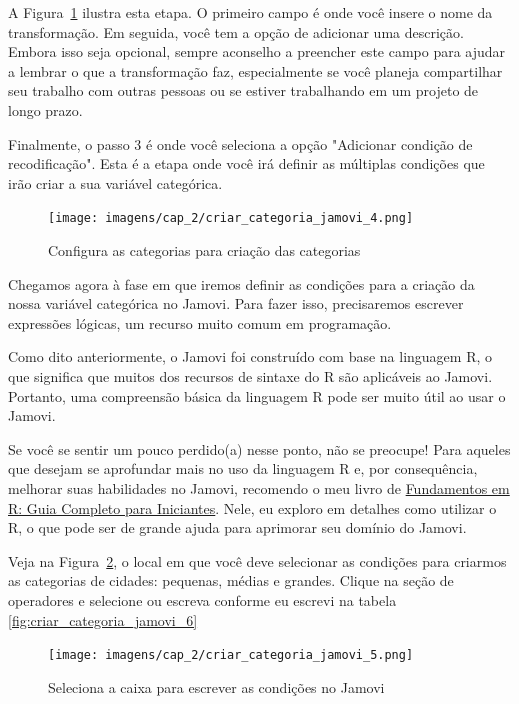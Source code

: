 A Figura~\ref{fig:criar_categoria_jamovi_4} ilustra esta etapa. O primeiro campo é onde você insere o nome da transformação. Em seguida, você tem a opção de adicionar uma descrição. Embora isso seja opcional, sempre aconselho a preencher este campo para ajudar a lembrar o que a transformação faz, especialmente se você planeja compartilhar seu trabalho com outras pessoas ou se estiver trabalhando em um projeto de longo prazo.

Finalmente, o passo 3 é onde você seleciona a opção "Adicionar condição de recodificação". Esta é a etapa onde você irá definir as múltiplas condições que irão criar a sua variável categórica.

\begin{figure}[H]
    \centering
    \caption{Configura as categorias para criação das categorias}
    \texttt{[image: imagens/cap\_2/criar\_categoria\_jamovi\_4.png]}
    \label{fig:criar_categoria_jamovi_4}
\end{figure}

Chegamos agora à fase em que iremos definir as condições para a criação da nossa variável categórica no Jamovi. Para fazer isso, precisaremos escrever expressões lógicas, um recurso muito comum em programação. 

Como dito anteriormente, o Jamovi foi construído com base na linguagem R, o que significa que muitos dos recursos de sintaxe do R são aplicáveis ao Jamovi. Portanto, uma compreensão básica da linguagem R pode ser muito útil ao usar o Jamovi.

Se você se sentir um pouco perdido(a) nesse ponto, não se preocupe! Para aqueles que desejam se aprofundar mais no uso da linguagem R e, por consequência, melhorar suas habilidades no Jamovi, recomendo o meu livro de \href{https://www.amazon.com.br/Fundamentos-Completo-Iniciantes-programa%C3%A7%C3%A3o-computa%C3%A7%C3%A3o-ebook/dp/B0B36NG18N}{Fundamentos em R: Guia Completo para Iniciantes}. Nele, eu exploro em detalhes como utilizar o R, o que pode ser de grande ajuda para aprimorar seu domínio do Jamovi.

Veja na Figura~\ref{fig:criar_categoria_jamovi_5}, o local em que você deve selecionar as condições para criarmos as categorias de cidades: pequenas, médias e grandes. Clique na seção de operadores e selecione ou escreva conforme eu escrevi na tabela \ref{fig:criar_categoria_jamovi_6}

\begin{figure}[H]
    \centering
    \caption{Seleciona a caixa para escrever as condições no Jamovi}
    \texttt{[image: imagens/cap\_2/criar\_categoria\_jamovi\_5.png]}
    \label{fig:criar_categoria_jamovi_5}
\end{figure}

